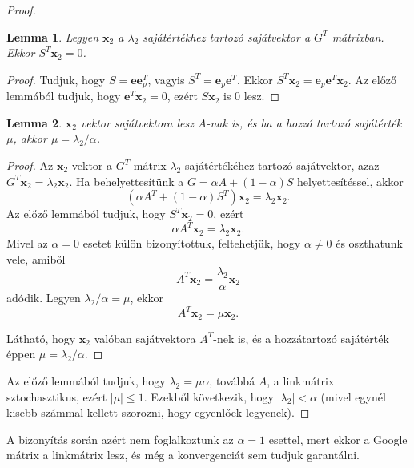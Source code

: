\documentclass[12pt,a4paper]{article}
\newcommand{\bx}{\mathbf{x}}
\newcommand{\be}{\mathbf{e}}
\newtheorem{lemma}{Lemma}[tetel]
\begin{document}
\begin{proof}
	\begin{lemma}
		Legyen $\bx_2$ a $\lambda_2$ sajátértékhez tartozó sajátvektor a $G^T$ mátrixban. Ekkor $S^T \bx_2 = 0$.
	\end{lemma}
	\begin{proof}
		Tudjuk, hogy $S = \be \be_p^T$, vagyis $S^T = \be_p \be^T$. Ekkor $S^T \bx_2 = \be_p \be^T \bx_2$. Az előző lemmából tudjuk, hogy $\be^T \bx_2 = 0$, ezért $S \bx_2$ is 0 lesz.
	\end{proof}
	
	\begin{lemma}
		$\bx_2$ vektor sajátvektora lesz $A$-nak is, és ha a hozzá tartozó sajátérték $\mu$, akkor $\mu = \lambda_2 / \alpha$. 
	\end{lemma}
    \begin{proof}
    	Az $\bx_2$ vektor a $G^T$ mátrix $\lambda_2$ sajátértékéhez tartozó sajátvektor, azaz $G^T \bx_2 = \lambda_2 \bx_2$. Ha behelyettesítünk a $G = \alpha A + (1-\alpha)S$ helyettesítéssel, akkor
    	\[ (\alpha A^T + (1-\alpha) S^T ) \bx_2 = \lambda_2 \bx_2. \]
    	Az előző lemmából tudjuk, hogy $S^T \bx_2 = 0$, ezért 
    	\[ \alpha A^T \bx_2 = \lambda_2 \bx_2. \]
    	Mivel az $\alpha = 0$ esetet külön bizonyítottuk, feltehetjük, hogy $\alpha \neq 0$ és oszthatunk vele, amiből
    	\[ A^T \bx_2 = \frac{\lambda_2}{\alpha} \bx_2 \]
    	adódik. Legyen $\lambda_2/\alpha = \mu$, ekkor
    	\[ A^T \bx_2 = \mu \bx_2. \]

    	Látható, hogy $\bx_2$ valóban sajátvektora $A^T$-nek is, és a hozzátartozó sajátérték éppen $\mu = \lambda_2/\alpha$.
    \end{proof}
	
	Az előző lemmából tudjuk, hogy $\lambda_2 = \mu \alpha$, továbbá $A$, a linkmátrix sztochasztikus, ezért $|\mu| \leq 1$. Ezekből következik, hogy $ |\lambda_2| < \alpha $ (mivel egynél kisebb számmal kellett szorozni, hogy egyenlőek legyenek).
\end{proof}

A bizonyítás során azért nem foglalkoztunk az $\alpha = 1$ esettel, mert ekkor a Google mátrix a linkmátrix lesz, és még a konvergenciát sem tudjuk garantálni.
\end{document}
